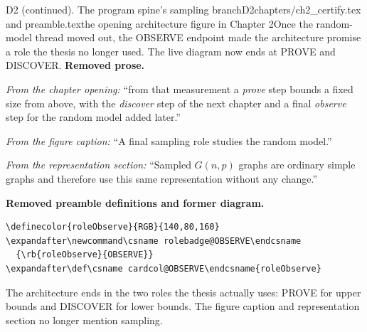 \begin{offcutrewrite}{D2 (continued). The program spine's sampling branch}{D2}{chapters/ch2\_certify.tex and preamble.tex}{the opening architecture figure in Chapter 2}{Once the random-model thread moved out, the OBSERVE endpoint made the architecture promise a role the thesis no longer used. The live diagram now ends at PROVE and DISCOVER.}
\noindent\textbf{Removed prose.}

\emph{From the chapter opening:} ``from that measurement a \emph{prove} step bounds a fixed size from above, with the \emph{discover} step of the next chapter and a final \emph{observe} step for the random model added later.''

\emph{From the figure caption:} ``A final sampling role studies the random model.''

\emph{From the representation section:} ``Sampled $G(n,p)$ graphs are ordinary simple graphs and therefore use this same representation without any change.''

\medskip
\noindent\textbf{Removed preamble definitions and former diagram.}

\begin{verbatim}
\definecolor{roleObserve}{RGB}{140,80,160}
\expandafter\newcommand\csname rolebadge@OBSERVE\endcsname
  {\rb{roleObserve}{OBSERVE}}
\expandafter\def\csname cardcol@OBSERVE\endcsname{roleObserve}
\end{verbatim}

\begin{center}
\end{center}
\nowreads
The architecture ends in the two roles the thesis actually uses: PROVE for upper bounds and DISCOVER for lower bounds. The figure caption and representation section no longer mention sampling.
\end{offcutrewrite}

